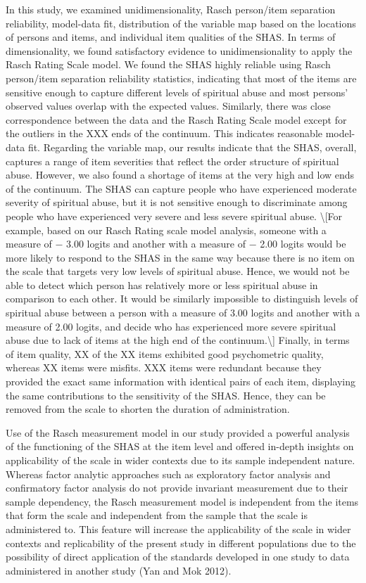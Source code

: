 \documentclass[
  letterpaper,
]{article}
\begin{document}
In this study, we examined unidimensionality, Rasch person/item
separation reliability, model-data fit, distribution of the variable map
based on the locations of persons and items, and individual item
qualities of the SHAS. In terms of dimensionality, we found satisfactory
evidence to unidimensionality to apply the Rasch Rating Scale model. We
found the SHAS highly reliable using Rasch person/item separation
reliability statistics, indicating that most of the items are sensitive
enough to capture different levels of spiritual abuse and most persons'
observed values overlap with the expected values. Similarly, there was
close correspondence between the data and the Rasch Rating Scale model
except for the outliers in the XXX ends of the continuum. This indicates
reasonable model-data fit. Regarding the variable map, our results
indicate that the SHAS, overall, captures a range of item severities
that reflect the order structure of spiritual abuse. However, we also
found a shortage of items at the very high and low ends of the
continuum. The SHAS can capture people who have experienced moderate
severity of spiritual abuse, but it is not sensitive enough to
discriminate among people who have experienced very severe and less
severe spiritual abuse. \textbackslash{[}For example, based on our Rasch
Rating scale model analysis, someone with a measure of − 3.00 logits and
another with a measure of − 2.00 logits would be more likely to respond
to the SHAS in the same way because there is no item on the scale that
targets very low levels of spiritual abuse. Hence, we would not be able
to detect which person has relatively more or less spiritual abuse in
comparison to each other. It would be similarly impossible to
distinguish levels of spiritual abuse between a person with a measure of
3.00 logits and another with a measure of 2.00 logits, and decide who
has experienced more severe spiritual abuse due to lack of items at the
high end of the continuum.\textbackslash{]} Finally, in terms of item
quality, XX of the XX items exhibited good psychometric quality, whereas
XX items were misfits. XXX items were redundant because they provided
the exact same information with identical pairs of each item, displaying
the same contributions to the sensitivity of the SHAS. Hence, they can
be removed from the scale to shorten the duration of administration.

Use of the Rasch measurement model in our study provided a powerful
analysis of the functioning of the SHAS at the item level and offered
in-depth insights on applicability of the scale in wider contexts due to
its sample independent nature. Whereas factor analytic approaches such
as exploratory factor analysis and confirmatory factor analysis do not
provide invariant measurement due to their sample dependency, the Rasch
measurement model is independent from the items that form the scale and
independent from the sample that the scale is administered to. This
feature will increase the applicability of the scale in wider contexts
and replicability of the present study in different populations due to
the possibility of direct application of the standards developed in one
study to data administered in another study (Yan and Mok 2012).
\end{document}
